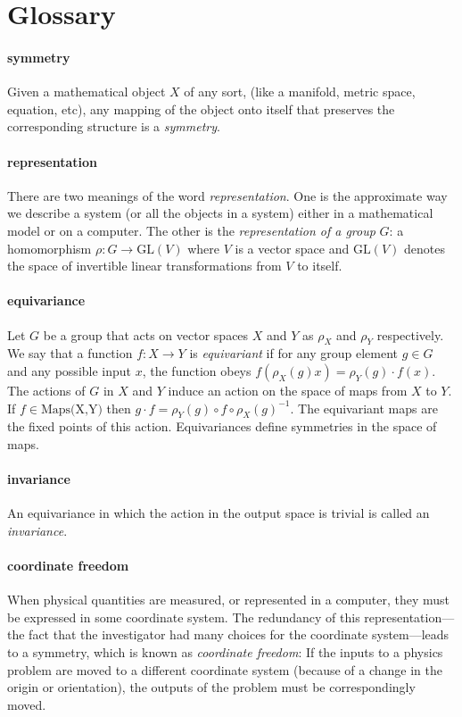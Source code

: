 \documentclass{article}
\theoremstyle{plain}
\theoremstyle{definition}
\theoremstyle{remark}
\begin{document}



\newpage\appendix\onecolumn
\section{Glossary}
\paragraph{symmetry}
Given a mathematical object $X$ of any sort, (like a manifold, metric space, equation, etc), any mapping of the object onto itself that preserves the corresponding structure is a \emph{symmetry}.

\paragraph{representation}
There are two meanings of the word \emph{representation}. One is the approximate way we describe a system (or all the objects in a system) either in a mathematical model or on a computer.
The other is the \emph{representation of a group} $G$: a homomorphism $\rho: G\to \text{GL}(V)$ where $V$ is a vector space and $\text{GL}(V)$ denotes the space of invertible linear transformations from $V$ to itself.

\paragraph{equivariance}
Let $G$ be a group that acts on vector spaces $X$ and $Y$ as $\rho_X$ and $\rho_Y$ respectively. We say that a function $f:X\to Y$ is \emph{equivariant} if for any group element $g\in G$ and any possible input $x$, the function obeys $f( \rho_X(g) x) = \rho_Y(g)\cdot f(x)$.
The actions of $G$ in $X$ and $Y$ induce an action on the space of maps from $X$ to $Y$. If $f\in \text{Maps(X,Y)}$ then $g\cdot f = \rho_Y(g)\circ f \circ \rho_X(g)^{-1}$.
The equivariant maps are the fixed points of this action.
Equivariances define symmetries in the space of maps. 

\paragraph{invariance}
An equivariance in which the action in the output space is trivial is called an \emph{invariance}.

\paragraph{coordinate freedom}
When physical quantities are measured, or represented in a computer, they must be expressed in some coordinate system.
The redundancy of this representation---the fact that the investigator had many choices for the coordinate system---leads to a symmetry, which is known as \emph{coordinate freedom}:
If the inputs to a physics problem are moved to a different coordinate system (because of a change in the origin or orientation), the outputs of the problem must be correspondingly moved.
\end{document}
